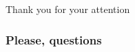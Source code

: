 \documentclass[
	11pt, %
]{beamer}
\begin{document}
%
%
%	
%	
%	
%
%
%



\begin{frame}[plain] %
	\begin{center}
		{\Huge Thank you for your attention}
		
		\bigskip 
		
		\titlepage		
	\end{center}
\end{frame}


\begin{frame}
	\frametitle{\Huge Please, questions} %
	
	\tableofcontents %
\end{frame}

%
%
%


\end{document}
